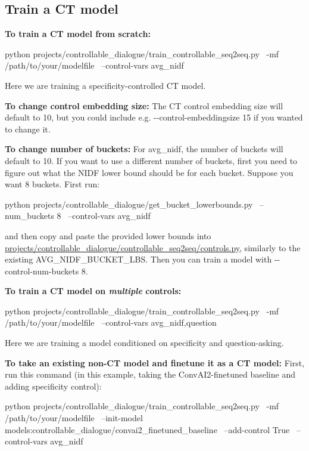 \subsection*{Train a CT model}

{\bfseries To train a CT model from scratch\+:} \begin{DoxyVerb}python projects/controllable_dialogue/train_controllable_seq2seq.py \
-mf /path/to/your/modelfile \
--control-vars avg_nidf
\end{DoxyVerb}


Here we are training a specificity-\/controlled CT model.

{\bfseries To change control embedding size\+:} The CT control embedding size will default to 10, but you could include e.\+g. {\ttfamily -\/-\/control-\/embeddingsize 15} if you wanted to change it.

{\bfseries To change number of buckets\+:} For {\ttfamily avg\+\_\+nidf}, the number of buckets will default to 10. If you want to use a different number of buckets, first you need to figure out what the N\+I\+DF lower bound should be for each bucket. Suppose you want 8 buckets. First run\+: \begin{DoxyVerb}python projects/controllable_dialogue/get_bucket_lowerbounds.py \
--num_buckets 8 \
--control-vars avg_nidf
\end{DoxyVerb}


and then copy and paste the provided lower bounds into {\ttfamily \hyperlink{controls_8py}{projects/controllable\+\_\+dialogue/controllable\+\_\+seq2seq/controls.\+py}}, similarly to the existing {\ttfamily A\+V\+G\+\_\+\+N\+I\+D\+F\+\_\+B\+U\+C\+K\+E\+T\+\_\+\+L\+BS}. Then you can train a model with {\ttfamily -\/-\/control-\/num-\/buckets 8}.

{\bfseries To train a CT model on {\itshape multiple} controls\+:} \begin{DoxyVerb}python projects/controllable_dialogue/train_controllable_seq2seq.py \
-mf /path/to/your/modelfile \
--control-vars avg_nidf,question
\end{DoxyVerb}


Here we are training a model conditioned on specificity and question-\/asking.

{\bfseries To take an existing non-\/\+CT model and finetune it as a CT model\+:} First, run this command (in this example, taking the Conv\+A\+I2-\/finetuned baseline and adding specificity control)\+: \begin{DoxyVerb}python projects/controllable_dialogue/train_controllable_seq2seq.py \
-mf /path/to/your/modelfile \
--init-model models:controllable_dialogue/convai2_finetuned_baseline \
--add-control True \
--control-vars avg_nidf
\end{DoxyVerb}


